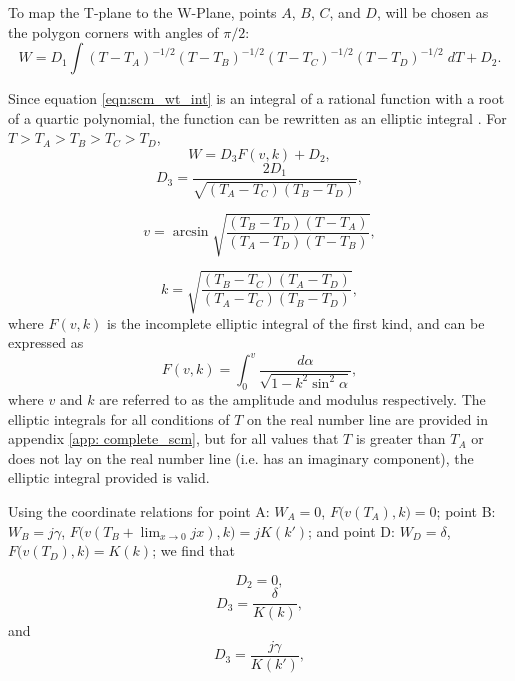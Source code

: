  \par To map the T-plane to the W-Plane, points $A$, $B$, $C$, and $D$, will be chosen as the polygon corners with angles of $\pi/2$:
 \begin{equation}
    W = D_1 \int (T-T_A)^{-1/2}(T-T_B)^{-1/2}(T-T_C)^{-1/2}(T-T_D)^{-1/2}\;dT + D_2.
    \label{eqn:scm_wt_int}
 \end{equation}
 
 \noindent Since equation \ref{eqn:scm_wt_int} is an integral of a rational function with a root of a quartic polynomial, the function can be rewritten as an elliptic integral \cite{i.s._gradshteyn_table_1980}. For $T > T_A > T_B > T_C > T_D$,
 \begin{equation}
     W = D_3F(v,k) + D_2,
 \end{equation}
 \begin{equation}
    D_3 = \frac{2D_1}{\sqrt{(T_A - T_C)(T_B-T_D)}},
 \end{equation}
 
 \begin{equation}
     v = \arcsin\sqrt{\frac{(T_B-T_D)(T-T_A)}{(T_A-T_D)(T-T_B)}},
 \end{equation}
 
 \begin{equation}
     k = \sqrt{\frac{(T_B-T_C)(T_A-T_D)}{(T_A-T_C)(T_B-T_D)}},
 \end{equation}
 \noindent where $F(v,k)$ is the incomplete elliptic integral of the first kind, and can be expressed as
 \begin{equation}
     F(v,k) = \int^v_0 \frac{d\alpha}{\sqrt{1 - k^2\sin^2\alpha}},
 \end{equation}
 \noindent where $v$ and $k$ are referred to as the amplitude and modulus respectively. The elliptic integrals for all conditions of $T$ on the real number line are provided in appendix \ref{app: complete_scm}, but for all values that $T$ is greater than $T_A$ or does not lay on the real number line (i.e. has an imaginary component), the elliptic integral provided is valid.
 
 \par Using the coordinate relations for point A: $W_A = 0$, $F\big(v(T_A),k\big) = 0$; point B: $W_B = j\gamma$, $F\big(v(T_B +\lim_{x\to 0} jx),k\big) = jK(k')$; and point D: $W_D = \delta$, $F\big(v(T_D),k\big) = K(k)$; we find that 
 
 \begin{equation}
     D_2 = 0,
 \end{equation}
 \begin{equation}
     D_3 = \frac{\delta}{K(k)},
     \label{eqn:D3 w/ d}
 \end{equation}
\noindent and
\begin{equation}
    D_3 = \frac{j\gamma}{K(k')},
    \label{eqn:D3 w/ gamma}
\end{equation}

